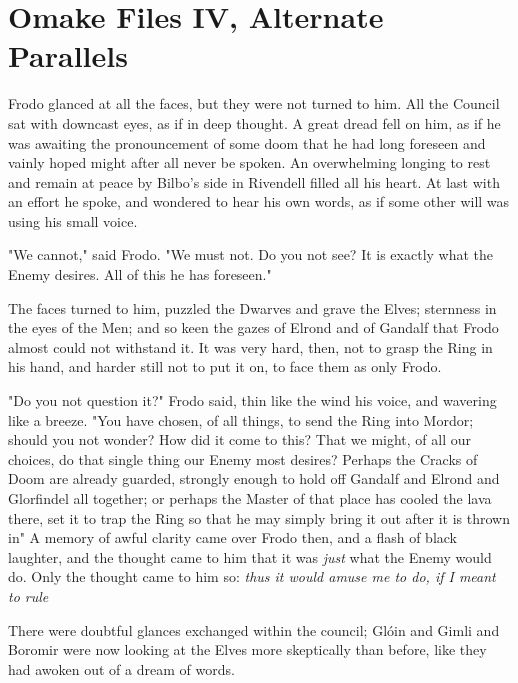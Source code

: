 \chapter{Omake Files IV, Alternate Parallels}


\noindent{}Frodo glanced at all the faces, but they were not turned to him. All the
Council sat with downcast eyes, as if in deep thought. A great dread fell on
him, as if he was awaiting the pronouncement of some doom that he had long
foreseen and vainly hoped might after all never be spoken. An overwhelming
longing to rest and remain at peace by Bilbo's side in Rivendell filled all his
heart. At last with an effort he spoke, and wondered to hear his own words, as
if some other will was using his small voice.

"We cannot," said Frodo. "We must not. Do you not see? It is exactly what the
Enemy desires. All of this he has foreseen."

The faces turned to him, puzzled the Dwarves and grave the Elves; sternness in
the eyes of the Men; and so keen the gazes of Elrond and of Gandalf that Frodo
almost could not withstand it. It was very hard, then, not to grasp the Ring in
his hand, and harder still not to put it on, to face them as only Frodo.

"Do you not question it?" Frodo said, thin like the wind his voice, and
wavering like a breeze. "You have chosen, of all things, to send the Ring into
Mordor; should you not wonder? How did it come to this? That we might, of all
our choices, do that single thing our Enemy most desires? Perhaps the Cracks of
Doom are already guarded, strongly enough to hold off Gandalf and Elrond and
Glorfindel all together; or perhaps the Master of that place has cooled the
lava there, set it to trap the Ring so that he may simply bring it out after it
is thrown in{\el}" A memory of awful clarity came over Frodo then, and a
flash of black laughter, and the thought came to him that it was \emph{just}
what the Enemy would do. Only the thought came to him so: \emph{thus it would
amuse me to do, if I meant to rule{\el}}

There were doubtful glances exchanged within the council; Glóin and Gimli and
Boromir were now looking at the Elves more skeptically than before, like they
had awoken out of a dream of words.

